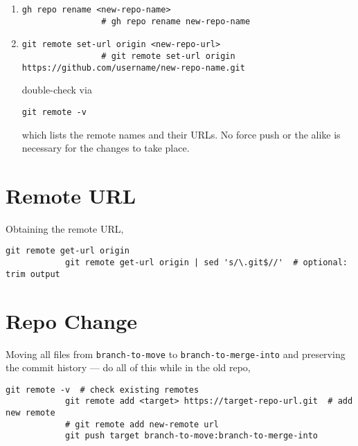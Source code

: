 \documentclass[12pt, a4paper]{scrbook}
\numberwithin{equation}{section}
\theoremstyle{definition}
\theoremstyle{definition}
\begin{document}
		\begin{enumerate}
			\item 
			
			\begin{lstlisting}[style=mystylebash, label=alg:git__rename_repo_remote, xleftmargin=\parindent]
				gh repo rename <new-repo-name>
				# gh repo rename new-repo-name
			\end{lstlisting}
			
			\item
			
			\begin{lstlisting}[style=mystylebash, label=alg:git__rename_repo, xleftmargin=\parindent]
				git remote set-url origin <new-repo-url>
				# git remote set-url origin https://github.com/username/new-repo-name.git 
			\end{lstlisting}		
			double-check via
			\begin{lstlisting}[style=mystylebash, label=alg:git__check_remote_url, xleftmargin=\parindent]
				git remote -v
			\end{lstlisting}
			which lists the remote names and their URLs. No force push or the alike is necessary for the changes to take place.
		\end{enumerate}
	
	\section{Remote URL}
		Obtaining the remote URL, 
		
		\begin{lstlisting}[style=mystylebash, label=alg:git__remote_url, xleftmargin=\parindent]
			git remote get-url origin 
			git remote get-url origin | sed 's/\.git$//'  # optional: trim output
		\end{lstlisting}
		
	\section{Repo Change}
		Moving all files from \texttt{branch-to-move} to \texttt{branch-to-merge-into} and preserving the commit history --- do all of this while in the old repo,
		
		\begin{lstlisting}[style=mystylebash, xleftmargin=\parindent]
			git remote -v  # check existing remotes
			git remote add <target> https://target-repo-url.git  # add new remote
			# git remote add new-remote url
			git push target branch-to-move:branch-to-merge-into 
		\end{lstlisting}
	
\end{document}
